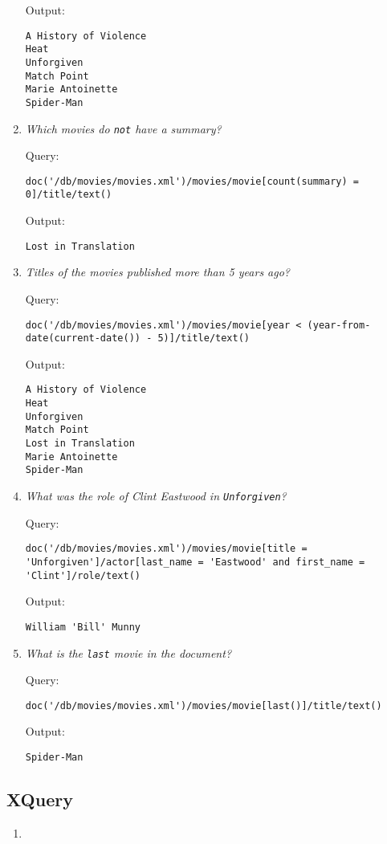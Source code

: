 \documentclass[a4paper, notitlepage]{article}
\begin{document}
\begin{enumerate}
Output:
  
\begin{lstlisting}
A History of Violence
Heat
Unforgiven
Match Point
Marie Antoinette
Spider-Man
\end{lstlisting}


\item 
  \emph{  Which movies do \lstinline{not} have a summary?} 
  
Query: 
  
\begin{lstlisting}
doc('/db/movies/movies.xml')/movies/movie[count(summary) = 0]/title/text()
\end{lstlisting}
  
Output:
  
\begin{lstlisting}
Lost in Translation
\end{lstlisting}

\item 
  \emph{  Titles of the movies published more than 5 years ago? } 
  
Query: 
  
\begin{lstlisting}
doc('/db/movies/movies.xml')/movies/movie[year < (year-from-date(current-date()) - 5)]/title/text()
\end{lstlisting}
  
Output:
  
\begin{lstlisting}
A History of Violence
Heat
Unforgiven
Match Point
Lost in Translation
Marie Antoinette
Spider-Man
\end{lstlisting}

\item 
  \emph{  What was the role of Clint Eastwood in \lstinline{Unforgiven}? } 
  
Query: 
  
\begin{lstlisting}
doc('/db/movies/movies.xml')/movies/movie[title = 'Unforgiven']/actor[last_name = 'Eastwood' and first_name = 'Clint']/role/text()
\end{lstlisting}
  
Output:
  
\begin{lstlisting}
William 'Bill' Munny
\end{lstlisting}
  

\item 
  \emph{  What is the \lstinline{last} movie in the document? } 
  
Query: 
  
\begin{lstlisting}
doc('/db/movies/movies.xml')/movies/movie[last()]/title/text()
\end{lstlisting}
  
Output:
  
\begin{lstlisting}
Spider-Man
\end{lstlisting}  
  
\end{enumerate}


\subsection{XQuery}

\begin{enumerate}
\item  
\end{enumerate}
\end{document}
